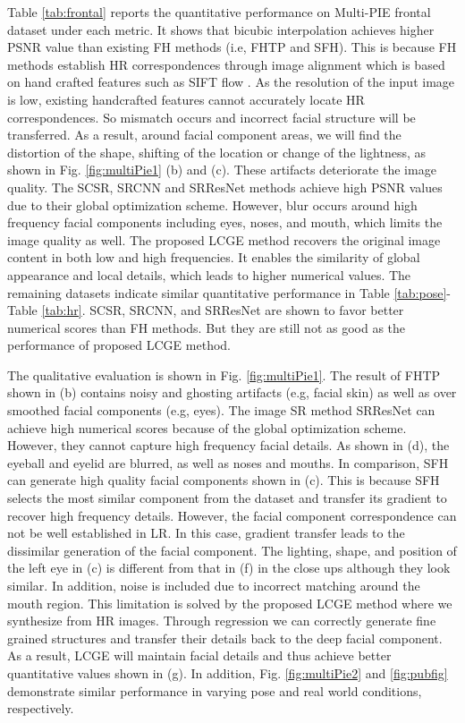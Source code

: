 \documentclass{article}
\begin{document}
Table \ref{tab:frontal} reports the quantitative performance on Multi-PIE frontal dataset under each metric. It shows that bicubic interpolation achieves higher PSNR value than existing FH methods (i.e, FHTP and SFH). This is because FH methods establish HR correspondences through image alignment which is based on hand crafted features such as SIFT flow \cite{liu-pami11-siftflow}. As the resolution of the input image is low, existing handcrafted features cannot accurately locate HR correspondences. So mismatch occurs and incorrect facial structure will be transferred. As a result, around facial component areas, we will find the distortion of the shape, shifting of the location or change of the lightness, as shown in Fig. \ref{fig:multiPie1} (b) and (c). These artifacts deteriorate the image quality. The SCSR, SRCNN and SRResNet methods achieve high PSNR values due to their global optimization scheme. However, blur occurs around high frequency facial components including eyes, noses, and mouth, which limits the image quality as well. The proposed LCGE method recovers the original image content in both low and high frequencies. It enables the similarity of global appearance and local details, which leads to higher numerical values. The remaining datasets indicate similar quantitative performance in Table \ref{tab:pose}-Table \ref{tab:hr}. SCSR, SRCNN, and SRResNet are shown to favor better numerical scores than FH methods. But they are still not as good as the performance of proposed LCGE method.

The qualitative evaluation is shown in Fig. \ref{fig:multiPie1}. The result of FHTP shown in (b) contains noisy and ghosting artifacts (e.g, facial skin) as well as over smoothed facial components (e.g, eyes). The image SR method SRResNet can achieve high numerical scores because of the global optimization scheme. However, they cannot capture high frequency facial details. As shown in (d), the eyeball and eyelid are blurred, as well as noses and mouths. In comparison, SFH can generate high quality facial components shown in (c). This is because SFH selects the most similar component from the dataset and transfer its gradient to recover high frequency details. However, the facial component correspondence can not be well established in LR. In this case, gradient transfer leads to the dissimilar generation of the facial component. The lighting, shape, and position of the left eye in (c) is different from that in (f) in the close ups although they look similar. In addition, noise is included due to incorrect matching around the mouth region. This limitation is solved by the proposed LCGE method where we synthesize from HR images. Through regression we can correctly generate fine grained structures and transfer their details back to the deep facial component. As a result, LCGE will maintain facial details and thus achieve better quantitative values shown in (g). In addition, Fig. \ref{fig:multiPie2} and \ref{fig:pubfig} demonstrate similar performance in varying pose and real world conditions, respectively.
\end{document}
